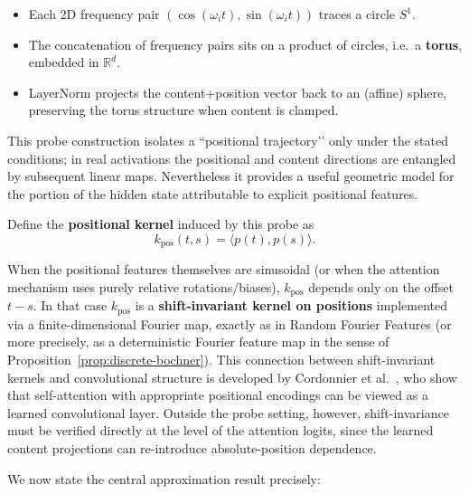 \documentclass[11pt]{article}
\theoremstyle{definition}
\begin{document}
\begin{itemize}
    \item Each 2D frequency pair \((\cos(\omega_i t), \sin(\omega_i t))\) traces a circle \(S^1\).
    \item The concatenation of frequency pairs sits on a product of circles, i.e.\ a \textbf{torus}, embedded in \(\mathbb{R}^d\).
    \item LayerNorm projects the content+position vector back to an (affine) sphere, preserving the torus structure when content is clamped.
\end{itemize}

This probe construction isolates a “positional trajectory’’ only under the stated conditions; in real activations the positional and content directions are entangled by subsequent linear maps. Nevertheless it provides a useful geometric model for the portion of the hidden state attributable to explicit positional features.

Define the \textbf{positional kernel} induced by this probe as
\[
k_{\text{pos}}(t,s) = \langle p(t), p(s) \rangle.
\]

When the positional features themselves are sinusoidal (or when the attention mechanism uses purely relative rotations/biases), \(k_{\text{pos}}\) depends only on the offset \(t-s\). In that case \(k_{\text{pos}}\) is a \textbf{shift-invariant kernel on positions} implemented via a finite-dimensional Fourier map, exactly as in Random Fourier Features (or more precisely, as a deterministic Fourier feature map in the sense of Proposition~\ref{prop:discrete-bochner}). This connection between shift-invariant kernels and convolutional structure is developed by Cordonnier et al.\ \cite{cordonnier2020attention}, who show that self-attention with appropriate positional encodings can be viewed as a learned convolutional layer. Outside the probe setting, however, shift-invariance must be verified directly at the level of the attention logits, since the learned content projections can re-introduce absolute-position dependence.

We now state the central approximation result precisely:
\end{document}
